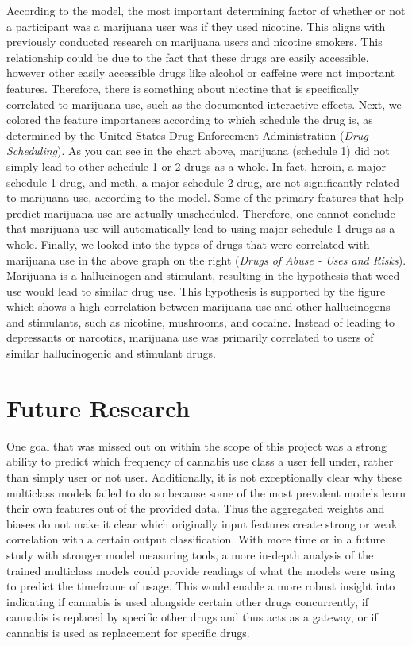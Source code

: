 \documentclass{article}
\begin{document}
According to the model, the most important determining factor of whether or not a participant was a marijuana user was if they used nicotine. This aligns with previously conducted research on marijuana users and nicotine smokers. This relationship could be due to the fact that these drugs are easily accessible, however other easily accessible drugs like alcohol or caffeine were not important features. Therefore, there is something about nicotine that is specifically correlated to marijuana use, such as the documented interactive effects. Next, we colored the feature importances according to which schedule the drug is, as determined by the United States Drug Enforcement Administration ({\it Drug Scheduling}). As you can see in the chart above, marijuana (schedule 1) did not simply lead to other schedule 1 or 2 drugs as a whole. In fact, heroin, a major schedule 1 drug, and meth, a major schedule 2 drug, are not significantly related to marijuana use, according to the model. Some of the primary features that help predict marijuana use are actually unscheduled. Therefore, one cannot conclude that marijuana use will automatically lead to using major schedule 1 drugs as a whole. Finally, we looked into the types of drugs that were correlated with marijuana use in the above graph on the right ({\it Drugs of Abuse - Uses and Risks}). Marijuana is a hallucinogen and stimulant, resulting in the hypothesis that weed use would lead to similar drug use. This hypothesis is supported by the figure which shows a high correlation between marijuana use and other hallucinogens and stimulants, such as nicotine, mushrooms, and cocaine. Instead of leading to depressants or narcotics, marijuana use was primarily correlated to users of similar hallucinogenic and stimulant drugs.
\vspace*{-4mm}
\section{Future Research}
\vspace*{-2mm}
One goal that was missed out on within the scope of this project was a strong ability to predict which frequency of cannabis use class a user fell under, rather than simply user or not user. Additionally, it is not exceptionally clear why these multiclass models failed to do so because some of the most prevalent models learn their own features out of the provided data. Thus the aggregated weights and biases do not make it clear which originally input features create strong or weak correlation with a certain output classification. With more time or in a future study with stronger model measuring tools, a more in-depth analysis of the trained multiclass models could provide readings of what the models were using to predict the timeframe of usage. This would enable a more robust insight into indicating if cannabis is used alongside certain other drugs concurrently, if cannabis is replaced by specific other drugs and thus acts as a gateway, or if cannabis is used as replacement for specific drugs.
\vspace*{-4mm}
\end{document}
